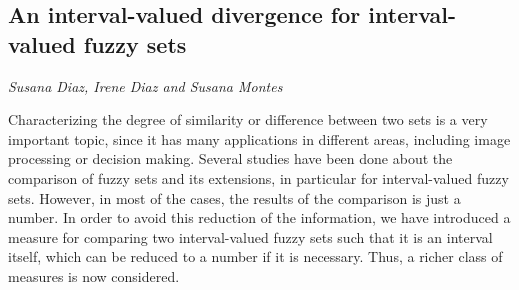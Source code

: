 \documentclass[../booklet.tex]{subfiles}
\begin{document}
\subsection[An interval-valued divergence for interval-valued fuzzy sets. {\it Susana Diaz, Irene Diaz and Susana Montes}]{An interval-valued divergence for interval-valued fuzzy sets}
  

\begin{center}
  {\it Susana Diaz, Irene Diaz and Susana Montes}
\end{center}

\vskip 0.8cm


Characterizing the degree of similarity or difference between two sets is a very important topic, since it has many applications in different areas, including image processing or decision making. Several studies have been done about the comparison of fuzzy sets and its extensions, in particular for interval-valued fuzzy sets. However, in most of the cases, the results of the comparison is just a number. In order to avoid this reduction of the information, we have introduced a measure for comparing two interval-valued fuzzy sets such that it is an interval itself, which can be reduced to a number if it is  necessary. Thus,  a richer class of measures is now considered.

\end{document}
